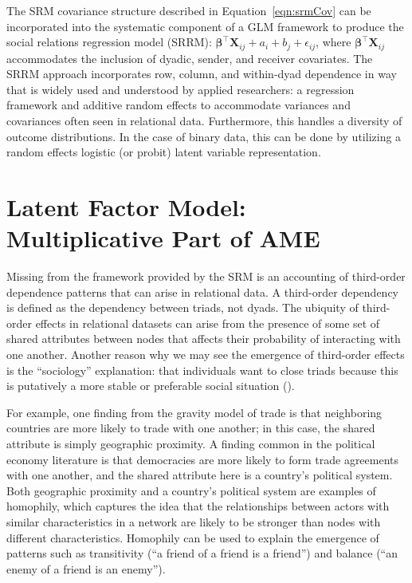 \documentclass[12pt,pdflatex]{elsarticle}
\begin{document}
The SRM covariance structure described in Equation~\ref{eqn:srmCov} can be incorporated into the systematic component of a GLM framework to produce the social relations regression model (SRRM): $\bm\beta^{\top} \mathbf{X}_{ij} + a_{i} + b_{j} + \epsilon_{ij}$, where $ \bm\beta^{\top} \mathbf{X}_{ij}$ accommodates the inclusion of dyadic, sender, and receiver covariates. The SRRM approach incorporates row, column, and within-dyad dependence in way that is widely used and understood by applied researchers: a regression framework and additive random effects to accommodate variances and covariances often seen in relational data. Furthermore, this  handles a diversity of outcome distributions. In the case of binary data, this can be done by utilizing a random effects logistic (or probit) latent variable representation.

\section*{Latent Factor Model: Multiplicative Part of AME}

Missing from the framework provided by the SRM is an accounting of third-order dependence patterns that can arise in relational data. A third-order dependency is defined as the dependency between triads, not dyads. The ubiquity of third-order effects in relational datasets can arise from the presence of some set of shared attributes between nodes that affects their probability of interacting with one another. Another reason why we may see the emergence of third-order effects is the ``sociology'' explanation: that individuals want to close triads because this is putatively a more stable or preferable social situation (\citealt{wasserman:faust:1994}).

For example, one finding from the gravity model of trade is that neighboring countries are more likely to trade with one another; in this case, the shared attribute is simply geographic proximity. A finding common in the political economy literature is that democracies are more likely to form trade agreements with one another, and the shared attribute here is a country's political system. Both geographic proximity and a country's political system are examples of homophily, which captures the idea that the relationships between actors with similar characteristics in a network are likely to be stronger than nodes with different characteristics. Homophily can be used to explain the emergence of patterns such as transitivity (``a friend of a friend is a friend'') and balance (``an enemy of a friend is an enemy''). 
\end{document}
